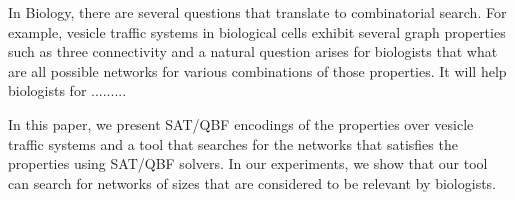 In Biology, there are several questions that translate to combinatorial 
search.
%
For example, vesicle traffic systems in biological cells exhibit
several graph properties such as three connectivity and
a natural question arises for biologists that what are all possible
networks for various combinations of those properties.
%
It will help biologists for .........

%
In this paper, we present SAT/QBF encodings of the properties over
vesicle traffic systems and a tool that searches for the networks
that satisfies the properties using SAT/QBF solvers.
%
In our experiments, we show that our tool can search for networks of
sizes that are considered to be relevant by biologists.



